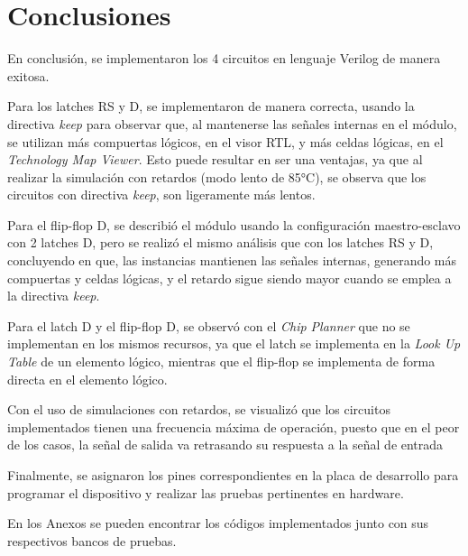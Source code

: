 \section{Conclusiones}
En conclusión, se implementaron los 4 circuitos en lenguaje Verilog de manera exitosa.

Para los latches RS y D, se implementaron de manera correcta, usando la directiva \textit{keep} para observar que, al mantenerse las señales internas en el módulo, se utilizan más compuertas lógicos, en el visor RTL, y más celdas lógicas, en el \textit{Technology Map Viewer}. Esto puede resultar en ser una ventajas, ya que al realizar la simulación con retardos (modo lento de 85°C), se observa que los circuitos con directiva \textit{keep}, son ligeramente más lentos.

Para el flip-flop D, se describió el módulo usando la configuración maestro-esclavo con 2 latches D, pero se realizó el mismo análisis que con los latches RS y D, concluyendo en que, las instancias mantienen las señales internas, generando más compuertas y celdas lógicas, y el retardo sigue siendo mayor cuando se emplea a la directiva \textit{keep}.

Para el latch D y el flip-flop D, se observó con el \textit{Chip Planner} que no se implementan en los mismos recursos, ya que el latch se implementa en la \textit{Look Up Table} de un elemento lógico, mientras que el flip-flop se implementa de forma directa en el elemento lógico. 

Con el uso de simulaciones con retardos, se visualizó que los circuitos implementados tienen una frecuencia máxima de operación, puesto que en el peor de los casos, la señal de salida va retrasando su respuesta a la señal de entrada

Finalmente, se asignaron los pines correspondientes en la placa de desarrollo para programar el dispositivo y realizar las pruebas pertinentes en hardware.

En los Anexos se pueden encontrar los códigos implementados junto con sus respectivos bancos de pruebas.